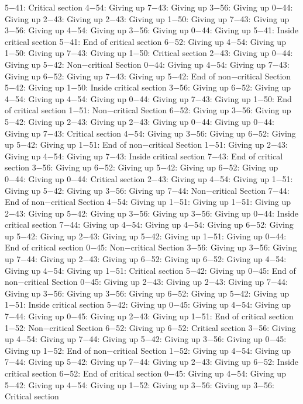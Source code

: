 5−41: Critical section
4−54: Giving up
7−43: Giving up
3−56: Giving up
0−44: Giving up
2−43: Giving up
2−43: Giving up
1−50: Giving up
7−43: Giving up
3−56: Giving up
4−54: Giving up
3−56: Giving up
0−44: Giving up
5−41: Inside critical section
5−41: End of critical section
6−52: Giving up
4−54: Giving up
1−50: Giving up
7−43: Giving up
1−50: Critical section
2−43: Giving up
0−44: Giving up
5−42: Non−critical Section
0−44: Giving up
4−54: Giving up
7−43: Giving up
6−52: Giving up
7−43: Giving up
5−42: End of non−critical Section
5−42: Giving up
1−50: Inside critical section
3−56: Giving up
6−52: Giving up
4−54: Giving up
4−54: Giving up
0−44: Giving up
7−43: Giving up
1−50: End of critical section
1−51: Non−critical Section
6−52: Giving up
3−56: Giving up
5−42: Giving up
2−43: Giving up
2−43: Giving up
0−44: Giving up
0−44: Giving up
7−43: Critical section
4−54: Giving up
3−56: Giving up
6−52: Giving up
5−42: Giving up
1−51: End of non−critical Section
1−51: Giving up
2−43: Giving up
4−54: Giving up
7−43: Inside critical section
7−43: End of critical section
3−56: Giving up
6−52: Giving up
5−42: Giving up
6−52: Giving up
0−44: Giving up
0−44: Critical section
2−43: Giving up
4−54: Giving up
1−51: Giving up
5−42: Giving up
3−56: Giving up
7−44: Non−critical Section
7−44: End of non−critical Section
4−54: Giving up
1−51: Giving up
1−51: Giving up
2−43: Giving up
5−42: Giving up
3−56: Giving up
3−56: Giving up
0−44: Inside critical section
7−44: Giving up
4−54: Giving up
4−54: Giving up
6−52: Giving up
5−42: Giving up
2−43: Giving up
5−42: Giving up
1−51: Giving up
0−44: End of critical section
0−45: Non−critical Section
3−56: Giving up
3−56: Giving up
7−44: Giving up
2−43: Giving up
6−52: Giving up
6−52: Giving up
4−54: Giving up
4−54: Giving up
1−51: Critical section
5−42: Giving up
0−45: End of non−critical Section
0−45: Giving up
2−43: Giving up
2−43: Giving up
7−44: Giving up
3−56: Giving up
3−56: Giving up
6−52: Giving up
5−42: Giving up
1−51: Inside critical section
5−42: Giving up
0−45: Giving up
4−54: Giving up
7−44: Giving up
0−45: Giving up
2−43: Giving up
1−51: End of critical section
1−52: Non−critical Section
6−52: Giving up
6−52: Critical section
3−56: Giving up
4−54: Giving up
7−44: Giving up
5−42: Giving up
3−56: Giving up
0−45: Giving up
1−52: End of non−critical Section
1−52: Giving up
4−54: Giving up
7−44: Giving up
5−42: Giving up
7−44: Giving up
2−43: Giving up
6−52: Inside critical section
6−52: End of critical section
0−45: Giving up
4−54: Giving up
5−42: Giving up
4−54: Giving up
1−52: Giving up
3−56: Giving up
3−56: Critical section
